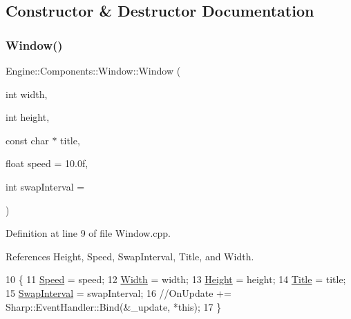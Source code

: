\subsection{Constructor \& Destructor Documentation}
\mbox{\label{classEngine_1_1Components_1_1Window_aa88c443e1b4cb90949aace6e1150305b}} 
\subsubsection{\texorpdfstring{Window()}{Window()}}
{\footnotesize\ttfamily Engine\+::\+Components\+::\+Window\+::\+Window (\begin{DoxyParamCaption}\item[{int}]{width,  }\item[{int}]{height,  }\item[{const char $\ast$}]{title,  }\item[{float}]{speed = {\ttfamily 10.0f},  }\item[{int}]{swap\+Interval = {} }\end{DoxyParamCaption})}



Definition at line 9 of file Window.\+cpp.



References Height, Speed, Swap\+Interval, Title, and Width.


\begin{DoxyCode}
10 \{
11     \mbox{\hyperlink{classEngine_1_1Components_1_1Window_a13e154573d91195ef0f545a9fa0e0403}{Speed}} = speed;
12     \mbox{\hyperlink{classEngine_1_1Components_1_1Window_ad5f71bfbb06ff5452b63bddf4b0c20b1}{Width}} = width;
13     \mbox{\hyperlink{classEngine_1_1Components_1_1Window_ad9cf40200634bff27dbc7ae9a841bb99}{Height}} = height;
14     \mbox{\hyperlink{classEngine_1_1Components_1_1Window_adedeb611fa5cecb35f940cea40e5badd}{Title}} = title;
15     \mbox{\hyperlink{classEngine_1_1Components_1_1Window_a99094c227614faf796be6db157cdf7e6}{SwapInterval}} = swapInterval;
16     \textcolor{comment}{//OnUpdate += Sharp::EventHandler::Bind(&\_update, *this);}
17 \}
\end{DoxyCode}
\mbox{\label{classEngine_1_1Components_1_1Window_a5f4bd958811d789d9380dd06a359163c}} 
